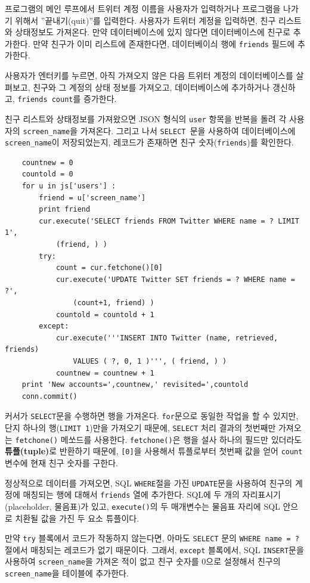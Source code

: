 프로그램의 메인 루프에서 트위터 계정 이름을 사용자가 입력하거나 프로그램을 나가기 위해서 ''끝내기(quit)''를 
입력한다. 사용자가 트위터 계정을 입력하면, 친구 리스트와 상태정보도 가져온다. 
만약 데이터베이스에 있지 않다면 데이터베이스에 친구로 추가한다.
만약 친구가 이미 리스트에 존재한다면, 데이터베이싀 행에 {\tt friends} 필드에 추가한다.

사용자가 엔터키를 누르면, 아직 가져오지 않은 다음 트위터 계정의 데이터베이스를 살펴보고,
친구와 그 계정의 상태 정보를 가져오고, 데이터베이스에 추가하거나 갱신하고, {\tt friends count}를 증가한다.

친구 리스트와 상태정보를 가져왔으면 JSON 형식의 {\tt user} 항목을 반복을 돌려 각 사용자의 
\verb"screen_name"을 가져온다. 그리고 나서 {\tt SELECT }문을 사용하여 데이터베이스에 
\verb"screen_name"이 저장되었는지, 레코드가 존재하면 친구 숫자({\tt friends})를 확인한다.

\beforeverb
\begin{verbatim}
    countnew = 0
    countold = 0
    for u in js['users'] :
        friend = u['screen_name']
        print friend
        cur.execute('SELECT friends FROM Twitter WHERE name = ? LIMIT 1', 
            (friend, ) )
        try:
            count = cur.fetchone()[0]
            cur.execute('UPDATE Twitter SET friends = ? WHERE name = ?', 
                (count+1, friend) )
            countold = countold + 1
        except:
            cur.execute('''INSERT INTO Twitter (name, retrieved, friends) 
                VALUES ( ?, 0, 1 )''', ( friend, ) )
            countnew = countnew + 1
    print 'New accounts=',countnew,' revisited=',countold
    conn.commit()
\end{verbatim}
\afterverb
%

커서가 {\tt SELECT}문을 수행하면 행을 가져온다. 
{\tt for}문으로 동일한 작업을 할 수 있지만, 단지 하나의 행({\tt LIMIT 1})만을 가져오기 때문에,
{\tt SELECT} 처리 결과의 첫번째만 가져오는 {\tt fetchone()} 메쏘드를 사용한다.
{\tt fetchone()}은 행을 설사 하나의 필드만 있더라도 {\bf 튜플(tuple)}로 반환하기 때문에,
 {\tt [0]}을 사용해서 튜플로부터 첫번째 값을 얻어 {\tt count} 변수에 현재 친구 숫자를 구한다.

정상적으로 데이터를 가져오면, SQL {\tt WHERE}절을 가진 {\tt UPDATE}문을 사용하여
친구의 계정에 매칭되는 행에 대해서 {\tt friends} 열에 추가한다.
SQL에 두 개의 자리표시기(placeholder, 물음표)가 있고, {\tt execute()}의 두 매개변수는 
물음표 자리에 SQL 안으로 치환될 값을 가진 두 요소 튜플이다.

만약 {\tt try} 블록에서 코드가 작동하지 않는다면, 아마도 {\tt SELECT} 문의
{\tt WHERE name = ?} 절에서 매칭되는 레코드가 없기 때문이다.
그래서, {\tt except} 블록에서, SQL {\tt INSERT}문을 사용하여 
\verb"screen_name"을 가져온 적이 없고 친구 숫자를 0으로 설정해서 
친구의 \verb"screen_name"을 테이블에 추가한다. 


